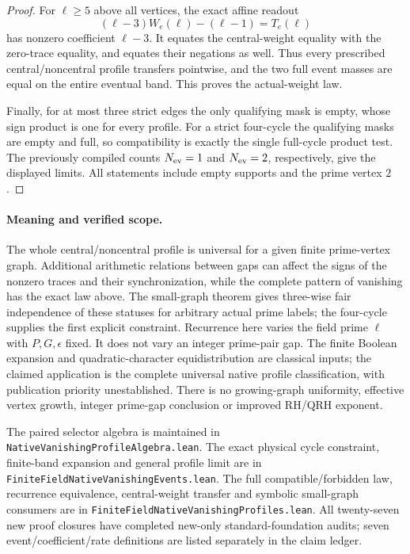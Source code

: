 \documentclass[11pt]{article}
\begin{document}
\begin{proof}
For \(\ell\geq5\) above all vertices, the exact affine readout
\[
 (\ell-3)W_e(\ell)-(\ell-1)=T_e(\ell)
\]
has nonzero coefficient \(\ell-3\).
It equates the central-weight equality with the zero-trace equality,
and equates their negations as well.
Thus every prescribed central/noncentral profile transfers pointwise,
and the two full event masses are equal on the entire eventual band.
This proves the actual-weight law.

Finally, for at most three strict edges the only qualifying mask is
empty, whose sign product is one for every profile.
For a strict four-cycle the qualifying masks are empty and full,
so compatibility is exactly the single full-cycle product test.
The previously compiled counts \(N_{\rm ev}=1\) and \(N_{\rm ev}=2\),
respectively, give the displayed limits.
All statements include empty supports and the prime vertex \(2\).
\end{proof}

\paragraph{Meaning and verified scope.}
The whole central/noncentral profile is universal for a given finite
prime-vertex graph. Additional arithmetic relations between gaps can
affect the signs of the nonzero traces and their synchronization, while
the complete pattern of vanishing has the exact law above.
The small-graph theorem gives three-wise fair independence of these
statuses for arbitrary actual prime labels; the four-cycle supplies the
first explicit constraint.
Recurrence here varies the field prime \(\ell\) with \(P,G,\epsilon\)
fixed. It does not vary an integer prime-pair gap.
The finite Boolean expansion and quadratic-character equidistribution
are classical inputs; the claimed application is the complete universal
native profile classification, with publication priority unestablished.
There is no growing-graph uniformity, effective vertex growth,
integer prime-gap conclusion or improved RH/QRH exponent.

The paired selector algebra is maintained in
\texttt{NativeVanishingProfileAlgebra.lean}.
The exact physical cycle constraint, finite-band expansion and general
profile limit are in \texttt{FiniteFieldNativeVanishingEvents.lean}.
The full compatible/forbidden law, recurrence equivalence,
central-weight transfer and symbolic small-graph consumers are in
\texttt{FiniteFieldNativeVanishingProfiles.lean}.
All twenty-seven new proof closures have completed new-only
standard-foundation audits; seven event/coefficient/rate definitions
are listed separately in the claim ledger.
\end{document}
